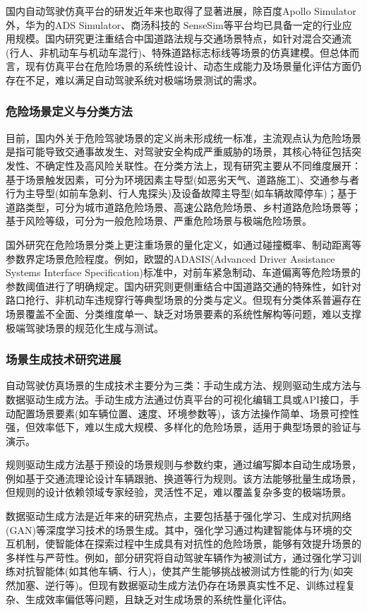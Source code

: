 国内自动驾驶仿真平台的研发近年来也取得了显著进展，除百度Apollo Simulator外，华为的ADS Simulator、商汤科技的 SenseSim等平台均已具备一定的行业应用规模。国内研究更注重结合中国道路法规与交通场景特点，如针对混合交通流(行人、非机动车与机动车混行)、特殊道路标志标线等场景的仿真建模。但总体而言，现有仿真平台在危险场景的系统性设计、动态生成能力及场景量化评估方面仍存在不足，难以满足自动驾驶系统对极端场景测试的需求。

\subsubsection{危险场景定义与分类方法}
目前，国内外关于危险驾驶场景的定义尚未形成统一标准，主流观点认为危险场景是指可能导致交通事故发生、对驾驶安全构成严重威胁的场景，其核心特征包括突发性、不确定性及高风险关联性。在分类方法上，现有研究主要从不同维度展开：基于场景触发因素，可分为环境因素主导型(如恶劣天气、道路施工)、交通参与者行为主导型(如前车急刹、行人鬼探头)及设备故障主导型(如车辆故障停车)；基于道路类型，可分为城市道路危险场景、高速公路危险场景、乡村道路危险场景等；基于风险等级，可分为一般危险场景、严重危险场景与极端危险场景。

国外研究在危险场景分类上更注重场景的量化定义，如通过碰撞概率、制动距离等参数界定场景危险程度。例如，欧盟的ADASIS(Advanced Driver Assistance Systems Interface Specification)标准中，对前车紧急制动、车道偏离等危险场景的参数阈值进行了明确规定。国内研究则更侧重结合中国道路交通的特殊性，如针对路口抢行、非机动车违规穿行等典型场景的分类与定义。但现有分类体系普遍存在场景覆盖不全面、分类维度单一、缺乏对场景要素的系统性解构等问题，难以支撑极端驾驶场景的规范化生成与测试。

\subsubsection{场景生成技术研究进展}
自动驾驶仿真场景的生成技术主要分为三类：手动生成方法、规则驱动生成方法与数据驱动生成方法。手动生成方法通过仿真平台的可视化编辑工具或API接口，手动配置场景要素(如车辆位置、速度、环境参数等)，该方法操作简单、场景可控性强，但效率低下，难以生成大规模、多样化的危险场景，适用于典型场景的验证与演示。

规则驱动生成方法基于预设的场景规则与参数约束，通过编写脚本自动生成场景，例如基于交通流理论设计车辆跟驰、换道等行为规则。该方法能够批量生成场景，但规则的设计依赖领域专家经验，灵活性不足，难以覆盖复杂多变的极端场景。

数据驱动生成方法是近年来的研究热点，主要包括基于强化学习、生成对抗网络(GAN)等深度学习技术的场景生成。其中，强化学习通过构建智能体与环境的交互机制，使智能体在探索过程中生成具有对抗性的危险场景，能够有效提升场景的多样性与严苛性。例如，部分研究将自动驾驶车辆作为被测试方，通过强化学习训练对抗智能体(如其他车辆、行人)，使其产生能够挑战被测试方性能的行为(如突然加塞、逆行等)。但现有数据驱动生成方法仍存在场景真实性不足、训练过程复杂、生成效率偏低等问题，且缺乏对生成场景的系统性量化评估。

